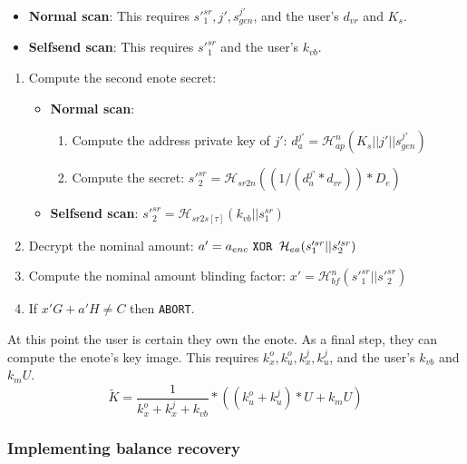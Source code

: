 \begin{itemize}
    \item \textbf{Normal scan}: This requires $s'^{sr}_1, j', s^{j'}_{gen}$, and the user's $d_{vr}$ and $K_s$.

    \item \textbf{Selfsend scan}: This requires $s'^{sr}_1$ and the user's $k_{vb}$.
\end{itemize}

\begin{enumerate}
    \item Compute the second enote secret:
        \begin{itemize}
        \item \textbf{Normal scan}:
            \begin{enumerate}
                \item Compute the address private key of $j'$: $d^{j'}_a = \mathcal{H}^n_{ap}(K_s || j' || s^{j'}_{gen})$
                \item Compute the secret: $s'^{sr}_2 = \mathcal{H}_{sr2n}((1/(d^{j'}_a * d_{vr})) * D_e)$
            \end{enumerate}
        \item \textbf{Selfsend scan}: $s'^{sr}_2 = \mathcal{H}_{sr2s[\tau]}(k_{vb} || s^{sr}_1)$
    \end{itemize}

    \item Decrypt the nominal amount: $a' = a_{enc} \textrm{ \tt  XOR } \mathcal{H}_{ea}(s'^{sr}_1 || s'^{sr}_2)$

    \item Compute the nominal amount blinding factor: $x' = \mathcal{H}^n_{bf}(s'^{sr}_1 || s'^{sr}_2)$

    \item If $x' G + a' H \neq C$ then {\tt ABORT}.
\end{enumerate}

At this point the user is certain they own the enote. As a final step, they can compute the enote's key image. This requires $k^o_x, k^o_u, k^j_x, k^j_u$, and the user's $k_{vb}$ and $k_m U$.\vspace{.115cm}
\[ \tilde{K} = \frac{1}{k^o_x + k^j_x + k_{vb}} *((k^o_u + k^j_u)*U + k_m U) \]

\subsubsection{Implementing balance recovery}
\label{subsubsec:jamtis-balance-recovery-implementing}

